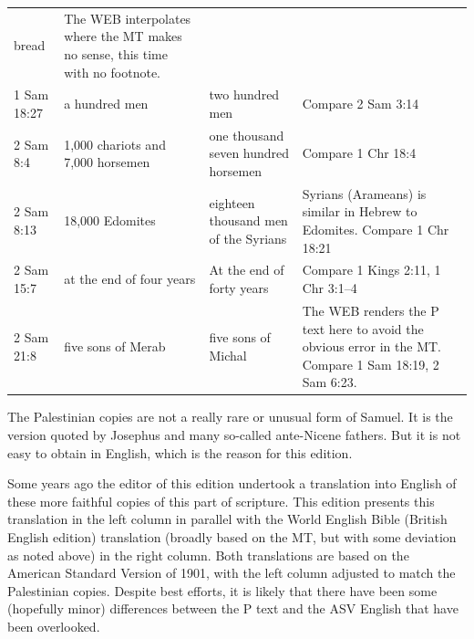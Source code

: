 {\begin{tabular}{p{}p{}p{}p{}}
                                                    bread&The WEB
                                                           interpolates
                                                           where the
                                                           MT makes no
                                                           sense, this
                                                           time with
                                                           no footnote.\\
  1 Sam 18:27&a hundred men&two hundred men&Compare 2 Sam 3:14\\
  2 Sam 8:4&1,000 chariots and 7,000 horsemen&one thousand seven
                                               hundred
                                               horsemen&Compare 1 Chr
                                                         18:4\\
  2 Sam 8:13&18,000 Edomites&eighteen thousand men of the
                              Syrians&Syrians (Arameans) is similar in
                                       Hebrew to Edomites. Compare 1
                                       Chr 18:21\\
  2 Sam 15:7&at the end of four years&At the end of forty
                                       years&Compare 1 Kings 2:11, 1
                                              Chr 3:1--4\\
  2 Sam 21:8&five sons of Merab&five sons of Michal&The WEB renders
                                                     the P text here
                                                     to avoid the
                                                     obvious error in
                                                     the MT. Compare 1
                                                     Sam 18:19, 2 Sam
                                                     6:23.
\end{tabular}
The Palestinian copies are not a really rare or unusual form of
Samuel. It is the version quoted by Josephus and many so-called
ante-Nicene fathers. But it is not easy to obtain in English, which is the reason
for this edition.

Some years ago the editor of this edition undertook a translation into
English of these more faithful copies of this part of scripture. This
edition presents this translation in the left column in parallel with
the World English Bible (British English edition) translation (broadly based on the MT, but with
  some deviation as noted above) in the right
column. Both translations are based on the American Standard
Version of 1901, with the left column adjusted to match the Palestinian
copies. Despite best efforts, it is likely that there have been
some (hopefully minor)
differences between the P text and the ASV English that have been
overlooked.

}
